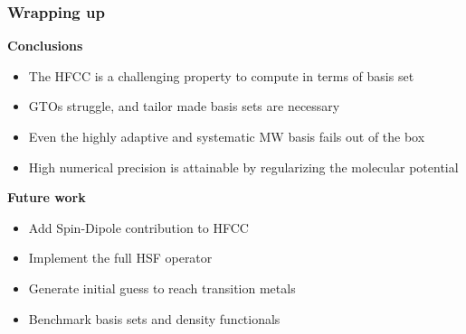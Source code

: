 \begin{frame}
\frametitle{Wrapping up}
\scriptsize
\textbf{Conclusions}
\begin{itemize}
\item The HFCC is a challenging property to compute in terms of basis set
\item GTOs struggle, and tailor made basis sets are necessary
\item Even the highly adaptive and systematic MW basis fails out of the box
\item High numerical precision is attainable by regularizing the molecular potential
\end{itemize}

\vspace{5mm}

\pause
\textbf{Future work}
\begin{itemize}
\item Add Spin-Dipole contribution to HFCC
\item Implement the full HSF operator
\item Generate initial guess to reach transition metals
\item Benchmark basis sets and density functionals
\end{itemize}
\end{frame}


